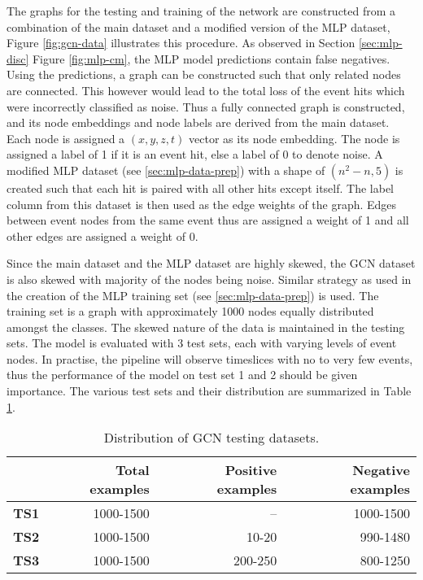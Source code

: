 The graphs for the testing and training of the network are constructed
from a combination of the main dataset and a modified version of the
MLP dataset, Figure \ref{fig:gcn-data} illustrates this procedure. As
observed in Section \ref{sec:mlp-disc} Figure \ref{fig:mlp-cm}, the
MLP model predictions contain false negatives. Using the predictions,
a graph can be constructed such that only related nodes are connected.
This however would lead to the total loss of the event hits which were
incorrectly classified as noise. Thus a fully connected graph is
constructed, and its node embeddings and node labels are derived from
the main dataset. Each node is assigned a $(x,y,z,t)$ vector as its
node embedding. The node is assigned a label of 1 if it is an event
hit, else a label of 0 to denote noise. A modified MLP dataset (see
\ref{sec:mlp-data-prep}) with a shape of \texttt{$(n^{2}-n, 5)$} is
created such that each hit is paired with all other hits except
itself. The label column from this dataset is then used as the edge
weights of the graph. Edges between event nodes from the same event
thus are assigned a weight of 1 and all other edges are assigned a
weight of 0.

Since the main dataset and the MLP dataset are highly skewed, the GCN
dataset is also skewed with majority of the nodes being noise. Similar
strategy as used in the creation of the MLP training set (see
\ref{sec:mlp-data-prep}) is used. The training set is a graph with
approximately 1000 nodes equally distributed amongst the classes. The
skewed nature of the data is maintained in the testing sets. The model
is evaluated with 3 test sets, each with varying levels of event
nodes. In practise, the pipeline will observe timeslices with no to
very few events, thus the performance of the model on test set 1 and 2
should be given importance. The various test sets and their
distribution are summarized in Table \ref{tab:gcn-test-dist}.

\begin{table}[htb]
  \centering
  \caption{Distribution of GCN testing datasets.}
  \begin{tabular}{lrrr}
    \hline
    & Total examples & Positive examples & Negative examples \\
    \hline
    \textbf{TS1} & 1000-1500 & -- & 1000-1500 \\
    \textbf{TS2} & 1000-1500 & 10-20 & 990-1480 \\
    \textbf{TS3} & 1000-1500 & 200-250 & 800-1250 \\
    \hline
  \end{tabular}
  \label{tab:gcn-test-dist}
\end{table}


